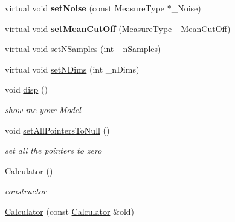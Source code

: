 \begin{DoxyCompactItemize}
\item 
virtual void {\bfseries set\+Noise} (const Measure\+Type $\ast$\+\_\+\+Noise)\hypertarget{class_ox_1_1_calculator_ac78f71339011991131c3b142ae1a9f45}{}\label{class_ox_1_1_calculator_ac78f71339011991131c3b142ae1a9f45}

\item 
virtual void {\bfseries set\+Mean\+Cut\+Off} (Measure\+Type \+\_\+\+Mean\+Cut\+Off)\hypertarget{class_ox_1_1_calculator_ad945e3f4dd3405c940bc8a22ea3f3ee9}{}\label{class_ox_1_1_calculator_ad945e3f4dd3405c940bc8a22ea3f3ee9}

\item 
virtual void \hyperlink{class_ox_1_1_calculator_a1d0d07b7840883449168448983d43289}{set\+N\+Samples} (int \+\_\+n\+Samples)
\item 
virtual void \hyperlink{class_ox_1_1_calculator_a40c854c0d75685ecc1da531f7400e3b1}{set\+N\+Dims} (int \+\_\+n\+Dims)
\item 
void \hyperlink{class_ox_1_1_calculator_a938a4bb0d2bc586bfb6982df28befbbf}{disp} ()\hypertarget{class_ox_1_1_calculator_a938a4bb0d2bc586bfb6982df28befbbf}{}\label{class_ox_1_1_calculator_a938a4bb0d2bc586bfb6982df28befbbf}

\begin{DoxyCompactList}\small\item\em show me your \hyperlink{class_ox_1_1_model}{Model} \end{DoxyCompactList}\item 
void \hyperlink{class_ox_1_1_calculator_acaaddad6379df03cccd825d565c9dd0e}{set\+All\+Pointers\+To\+Null} ()\hypertarget{class_ox_1_1_calculator_acaaddad6379df03cccd825d565c9dd0e}{}\label{class_ox_1_1_calculator_acaaddad6379df03cccd825d565c9dd0e}

\begin{DoxyCompactList}\small\item\em set all the pointers to zero \end{DoxyCompactList}\item 
\hyperlink{class_ox_1_1_calculator_a4a3762f0c260cb0e34f72e40a7329d27}{Calculator} ()\hypertarget{class_ox_1_1_calculator_a4a3762f0c260cb0e34f72e40a7329d27}{}\label{class_ox_1_1_calculator_a4a3762f0c260cb0e34f72e40a7329d27}

\begin{DoxyCompactList}\small\item\em constructor \end{DoxyCompactList}\item 
\hyperlink{class_ox_1_1_calculator_a600434abcaff13ac70d0d4b06b9df583}{Calculator} (const \hyperlink{class_ox_1_1_calculator}{Calculator} \&old)\hypertarget{class_ox_1_1_calculator_a600434abcaff13ac70d0d4b06b9df583}{}\label{class_ox_1_1_calculator_a600434abcaff13ac70d0d4b06b9df583}


\end{DoxyCompactItemize}
